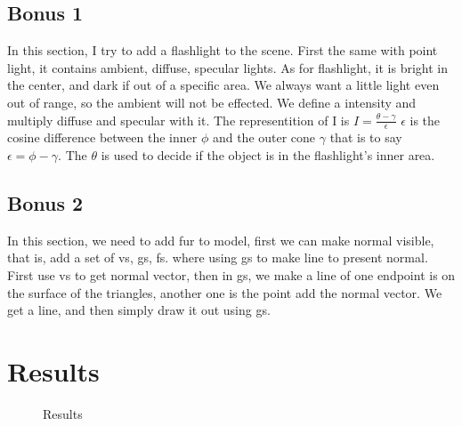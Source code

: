\documentclass[acmtog]{acmart}
\begin{document}
\subsection{Bonus 1} 
	In this section, I try to add a flashlight to the scene. First the same with point light, it contains
	ambient, diffuse, specular lights. As for flashlight, it is bright in the center, and dark if out of a specific area.
	We always want a little light even out of range, so the ambient will not be effected. We define a intensity
	and multiply diffuse and specular with it. The representition of I is \(I = \frac{\theta - \gamma}{\epsilon}\)
	$\epsilon$ is the cosine difference between the inner $\phi$ and the outer cone $\gamma$
	that is to say \(\epsilon = \phi - \gamma\). The $\theta$ is used to decide if the object is in the flashlight's inner area.
\subsection{Bonus 2}
	In this section, we need to add fur to model, first we can make normal visible, that is, add a set of vs, gs, fs.
	where using gs to make line to present normal. First use vs to get normal vector,
	then in gs, we make a line of one endpoint is on the surface of the triangles, another one is the point add the normal vector.
	We get a line, and then simply draw it out using gs.
\section{Results}
\begin{figure}[H]
	\centering
	\caption{Results}
	\label{Fig.main}
	\end{figure}
\end{document}
